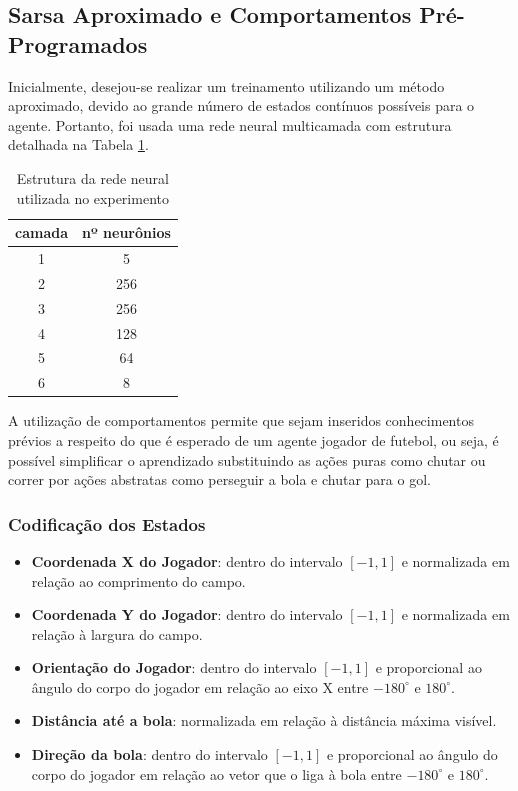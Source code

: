 \subsection{Sarsa Aproximado e Comportamentos Pré-Programados}

Inicialmente, desejou-se realizar um treinamento utilizando um método aproximado, devido ao grande número de estados contínuos possíveis para o agente. Portanto, foi usada uma rede neural multicamada com estrutura detalhada na Tabela \ref{table:ann}.

\begin{table}[h]
	\centering
	\begin{tabular}{||c c||} 
		\hline
		camada & nº neurônios  \\ [0.5ex] 
		\hline\hline
		1 & 5  \\ 
		\hline
		2 &  256 \\
		\hline
		3 & 256 \\
		\hline
		4 & 128  \\
		\hline
		5 & 64 \\ 
		\hline
		6 & 8 \\ [1ex] 
		\hline
	\end{tabular}
	\caption{Estrutura da rede neural utilizada no experimento}
	\label{table:ann}
\end{table}

A utilização de comportamentos permite que sejam inseridos conhecimentos prévios a respeito do que é esperado de um agente jogador de futebol, ou seja, é possível simplificar o aprendizado substituindo as ações puras como chutar ou correr por ações abstratas como perseguir a bola e chutar para o gol.

\subsubsection{Codificação dos Estados}
\label{subsubsec:state-approx}


\begin{itemize}
	\item \textbf{Coordenada X do Jogador}: dentro do intervalo $[-1, 1]$ e normalizada em relação ao comprimento do campo.
	\item \textbf{Coordenada Y do Jogador}: dentro do intervalo $[-1, 1]$ e normalizada em relação à largura do campo.
	\item \textbf{Orientação do Jogador}: dentro do intervalo $[-1, 1]$ e proporcional ao ângulo do corpo do jogador em relação ao eixo X entre $-180^{\circ}$ e $180^{\circ}$.
	\item \textbf{Distância até a bola}: normalizada em relação à distância máxima visível.
	\item \textbf{Direção da bola}: dentro do intervalo $[-1, 1]$ e proporcional ao ângulo do corpo do jogador em relação ao vetor que o liga à bola entre $-180^{\circ}$ e $180^{\circ}$. 
	
\end{itemize}

